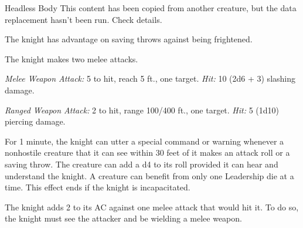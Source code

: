 \documentclass[10pt,a4paper,twoside,bg=print,twocolumn,openany,nodeprecatedcode]{dndbook}
\begin{document}
\begin{DndMonster}[float=t]{Headless Body}
\DndMonsterBasics[
armor-class = {18 (\textit{plate armor})},
hit-points = {\DndDice{8d8 + 16}},
speed = {30 ft.}
]
\DndMonsterAbilityScores[
 str = 16,
 dex = 11,
 con = 14,
 int = 11,
 wis = 11,
 cha = 15
]
\DndMonsterDetails[
saving-throws = {Con +4, Wis +2},
languages = {any one language (usually Common)},
challenge = 3,
]
This content has been copied from another creature, but the data replacement hasn't been run. Check details.

The knight has advantage on saving throws against being frightened.

The knight makes two melee attacks.

\textsl{Melee Weapon Attack:} 5 to hit, reach 5 ft., one target. \textsl{Hit:} 10 (2d6 + 3) slashing damage.

\textsl{Ranged Weapon Attack:} 2 to hit, range 100/400 ft., one target. \textsl{Hit:} 5 (1d10) piercing damage.

For 1 minute, the knight can utter a special command or warning whenever a nonhostile creature that it can see within 30 feet of it makes an attack roll or a saving throw. The creature can add a d4 to its roll provided it can hear and understand the knight. A creature can benefit from only one Leadership die at a time. This effect ends if the knight is incapacitated.

The knight adds 2 to its AC against one melee attack that would hit it. To do so, the knight must see the attacker and be wielding a melee weapon.

\end{DndMonster}
\end{document}
